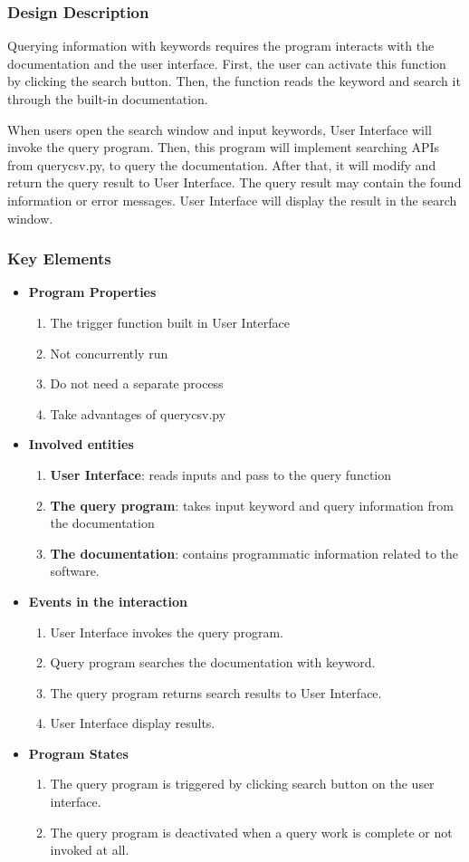 \documentclass [10pt]{article}
\begin{document}
\subsubsection{Design Description}
Querying information with keywords requires the program interacts with the documentation and the user interface. First, the user can activate this function by clicking the search button. Then, the function reads the keyword and search it through the built-in documentation. \par
When users open the search window and input keywords, User Interface will invoke the query program. Then, this program will implement searching APIs from querycsv.py, to query the documentation. After that, it will modify and return the query result to User Interface. The query result may contain the found information or error messages. User Interface will display the result in the search window.
\subsubsection{Key Elements}
\begin{itemize}
\item \textbf{Program Properties}
	\begin{enumerate}
	\item The trigger function built in User Interface 
    \item Not concurrently run
    \item Do not need a separate process
    \item Take advantages of querycsv.py
	\end{enumerate}
\item \textbf{Involved entities}
  	  \begin{enumerate}
      \item \textbf{User Interface}: reads inputs and pass to the query function
      \item \textbf{The query program}: takes input keyword and query information from the documentation
      \item \textbf{The documentation}: contains programmatic information related to the software.
      \end{enumerate}
\item \textbf{Events in the interaction}
	\begin{enumerate}
	\item User Interface invokes the query program.
    \item Query program searches the documentation with keyword.
	\item The query program returns search results to User Interface.
    \item User Interface display results.
	\end{enumerate}
\item \textbf{Program States}
	\begin{enumerate}
	\item The query program is triggered by clicking search button on the user interface.
    \item The query program is deactivated when a query work is complete or not invoked at all.
	\end{enumerate}
\end{itemize}
\end{document}
